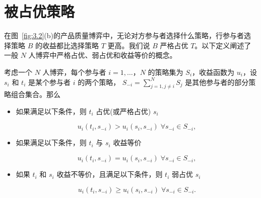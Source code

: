 \section{被占优策略}

在图~\ref{fig:3.2}(b)的产品质量博弈中，无论对方参与者选择什么策略，行参与者选择策略 \(B\) 的收益都比选择策略 \(T\) 更高。我们说 \(B\) 严格占优 \(T\)。以下定义阐述了一般 \(N\) 人博弈中严格占优、弱占优和收益等价的概念。

\begin{definition}\label{def:3.2}
    考虑一个 \(N\) 人博弈，每个参与者 \(i = 1,\ldots，N\) 的策略集为 \({S}_{i}\)，收益函数为 \({u}_{i}\)，设 \({s}_{i}\) 和 \({t}_{i}\) 是某个参与者 \(i\) 的两个策略， \({S}_{-i} = \mathop{\sum }\limits_{{j = 1,j \neq  i}}^{N}{S}_{j}\) 是其他参与者的部分策略组合集合。那么

\begin{itemize}
\item 如果满足以下条件，则 \({t}_{i}\) 占优(或严格占优) \({s}_{i}\)

\begin{equation}\label{eq:3.4}
{u}_{i}\left( {{t}_{i},{s}_{-i}}\right)  > {u}_{i}\left( {{s}_{i},{s}_{-i}}\right) \;\forall {s}_{-i} \in  {S}_{-i}, 
\end{equation}

\item 如果满足以下条件，则 \({t}_{i}\) 与 \({s}_{i}\) 收益等价

\[
{u}_{i}\left( {{t}_{i},{s}_{-i}}\right)  = {u}_{i}\left( {{s}_{i},{s}_{-i}}\right) \;\forall {s}_{-i} \in  {S}_{-i},
\]


\item 如果 \({t}_{i}\) 和 \({s}_{i}\) 收益不等价，且满足以下条件，则 \({t}_{i}\) 弱占优 \({s}_{i}\)


\begin{equation}\label{eq:3.5}
{u}_{i}\left( {{t}_{i},{s}_{-i}}\right)  \geq  {u}_{i}\left( {{s}_{i},{s}_{-i}}\right) \;\forall {s}_{-i} \in  {S}_{-i}. 
\end{equation}
\end{itemize}

\end{definition}

